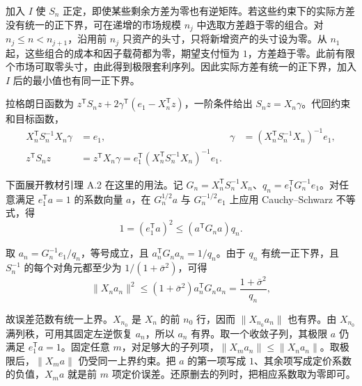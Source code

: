 \begin{solution}[label-content={证明},blank-type=none]
加入 $I$ 使 $S_n$ 正定，即使某些剩余方差为零也有逆矩阵。若这些约束下的实际方差没有统一的正下界，可在递增的市场规模 $n_j$ 中选取方差趋于零的组合。对 $n_j\le n<n_{j+1}$，沿用前 $n_j$ 只资产的头寸，只将新增资产的头寸设为零。从 $n_1$ 起，这些组合的成本和因子载荷都为零，期望支付恒为 $1$，方差趋于零。此前有限个市场可取零头寸，由此得到极限套利序列。因此实际方差有统一的正下界，加入 $I$ 后的最小值也有同一正下界。

拉格朗日函数为 $z^{\mathsf T}S_nz+2\gamma^{\mathsf T}(e_1-X_n^{\mathsf T}z)$，一阶条件给出 $S_nz=X_n\gamma$。代回约束和目标函数，
\begin{align*}
 X_n^{\mathsf T}S_n^{-1}X_n\gamma&=e_1,
 &\gamma&=(X_n^{\mathsf T}S_n^{-1}X_n)^{-1}e_1,\\
 z^{\mathsf T}S_nz&=z^{\mathsf T}X_n\gamma
 =e_1^{\mathsf T}(X_n^{\mathsf T}S_n^{-1}X_n)^{-1}e_1 .
\end{align*}

下面展开教材引理 A.2 在这里的用法。记 $G_n=X_n^{\mathsf T}S_n^{-1}X_n$、$q_n=e_1^{\mathsf T}G_n^{-1}e_1$。对任意满足 $e_1^{\mathsf T}a=1$ 的系数向量 $a$，在 $G_n^{1/2}a$ 与 $G_n^{-1/2}e_1$ 上应用 Cauchy--Schwarz 不等式，得
\[
 1=(e_1^{\mathsf T}a)^2\le (a^{\mathsf T}G_na)q_n.
\]

取 $a_n=G_n^{-1}e_1/q_n$，等号成立，且 $a_n^{\mathsf T}G_na_n=1/q_n$。由于 $q_n$ 有统一正下界，且 $S_n^{-1}$ 的每个对角元都至少为 $1/(1+\bar\sigma^2)$，可得
\[
 \|X_na_n\|^2\le(1+\bar\sigma^2)a_n^{\mathsf T}G_na_n
 =\frac{1+\bar\sigma^2}{q_n},
\]

故误差范数有统一上界。$X_{n_0}$ 是 $X_n$ 的前 $n_0$ 行，因而 $\|X_{n_0}a_n\|$ 也有界。由 $X_{n_0}$ 满列秩，可用其固定左逆恢复 $a_n$，所以 $a_n$ 有界。取一个收敛子列，其极限 $a$ 仍满足 $e_1^{\mathsf T}a=1$。固定任意 $m$，对足够大的子列项，$\|X_m a_n\|\le\|X_n a_n\|$。取极限后，$\|X_m a\|$ 仍受同一上界约束。把 $a$ 的第一项写成 $1$、其余项写成定价系数的负值，$X_m a$ 就是前 $m$ 项定价误差。还原删去的列时，把相应系数取为零即可。
\end{solution}

